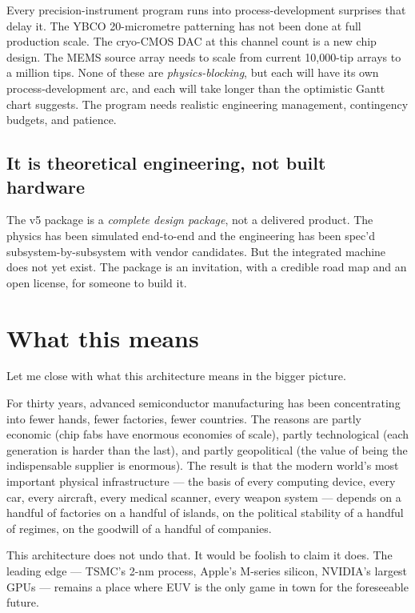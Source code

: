 \documentclass[11pt,letterpaper]{article}
\begin{document}
Every precision-instrument program runs into process-development surprises that delay it. The YBCO 20-micrometre patterning has not been done at full production scale. The cryo-CMOS DAC at this channel count is a new chip design. The MEMS source array needs to scale from current 10{,}000-tip arrays to a million tips. None of these are \emph{physics-blocking}, but each will have its own process-development arc, and each will take longer than the optimistic Gantt chart suggests. The program needs realistic engineering management, contingency budgets, and patience.

\subsection{It is theoretical engineering, not built hardware}

The v5 package is a \emph{complete design package}, not a delivered product. The physics has been simulated end-to-end and the engineering has been spec'd subsystem-by-subsystem with vendor candidates. But the integrated machine does not yet exist. The package is an invitation, with a credible road map and an open license, for someone to build it.

\section{What this means}

Let me close with what this architecture means in the bigger picture.

For thirty years, advanced semiconductor manufacturing has been concentrating into fewer hands, fewer factories, fewer countries. The reasons are partly economic (chip fabs have enormous economies of scale), partly technological (each generation is harder than the last), and partly geopolitical (the value of being the indispensable supplier is enormous). The result is that the modern world's most important physical infrastructure --- the basis of every computing device, every car, every aircraft, every medical scanner, every weapon system --- depends on a handful of factories on a handful of islands, on the political stability of a handful of regimes, on the goodwill of a handful of companies.

This architecture does not undo that. It would be foolish to claim it does. The leading edge --- TSMC's 2-nm process, Apple's M-series silicon, NVIDIA's largest GPUs --- remains a place where EUV is the only game in town for the foreseeable future.
\end{document}
